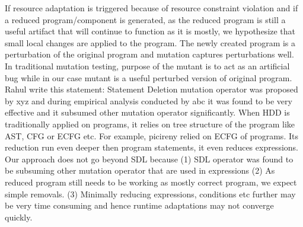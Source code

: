 
If resource adaptation is triggered because of resource constraint violation and if a reduced program/component is generated, as the reduced program is still a useful artifact that will continue to function as it is mostly, we hypothesize that small local changes are applied to the program. The newly created program is a perturbation of the original program and mutation captures perturbations well. In traditional mutation testing, purpose of the mutant is to act as an artificial bug while in our case mutant is a useful perturbed version of original program. Rahul write this statement: Statement Deletion mutation operator was proposed by xyz and during empirical analysis conducted by abc it was found to be very effective and it subsumed other mutation operator significantly. When HDD is traditionally applied on programs, it relies on tree structure of the program like AST, CFG or ECFG etc. For example, picireny relied on ECFG of programs. Its reduction run even deeper then program statements, it even reduces expressions. Our approach does not go beyond SDL because (1) SDL operator was found to be subsuming other mutation operator that are used in expressions (2) As reduced program still needs to be working as mostly correct program, we expect simple removals. (3) Minimally reducing expressions, conditions etc further may be very time consuming and hence runtime adaptations may not converge quickly.

   
